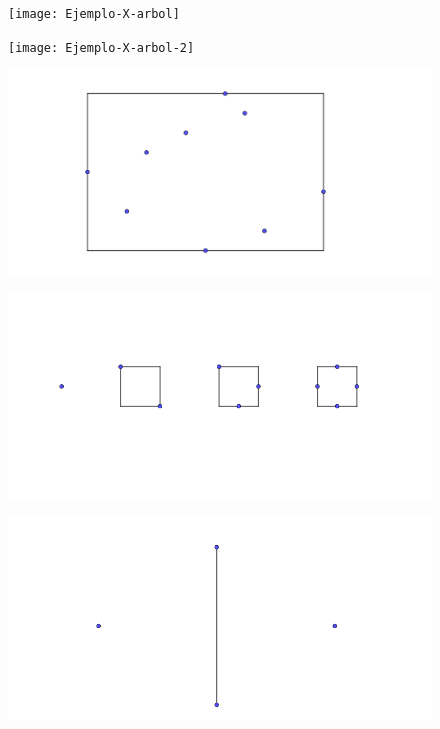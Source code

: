 \documentclass{beamer}
\begin{document}
\begin{frame}
\begin{figure}[h]
\texttt{[image: Ejemplo-X-arbol]}
\end{figure}
\end{frame}
\begin{frame}
\begin{figure}[h]
\texttt{[image: Ejemplo-X-arbol-2]}
\end{figure}
\end{frame}
\begin{frame}
\begin{figure}[h]
\includegraphics[width=\textwidth]{Ejemplo-rect-S}
\end{figure}
\end{frame}
\begin{frame}
\begin{figure}[h]
\includegraphics[width=\textwidth]{Cantidad-en-rect-S}
\end{figure}
\end{frame}
\begin{frame}
\begin{figure}[h]
\includegraphics[width=\textwidth]{Arbol-imposible-sin-cruces}
\end{figure}
\end{frame}
\end{document}

